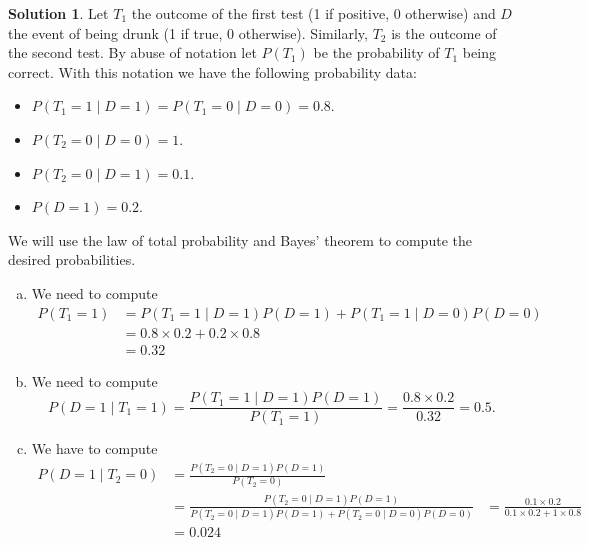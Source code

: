 \documentclass{article}
\theoremstyle{plain}
\theoremstyle{definition}
\newtheorem*{sol*}{Solution}
\begin{document}
\begin{sol*}
Let $T_1$ the outcome of the first test (1 if positive, 0 otherwise) and $D$ the event of being drunk (1 if true, 0 otherwise). Similarly, $T_2$ is the outcome of the second test. By abuse of notation let $P(T_1)$ be the probability of $T_1$ being correct. With this notation we have the following probability data:

\begin{itemize}
\item $P(T_1 = 1\mid D = 1)=P(T_1 = 0\mid D = 0)=0.8$.%

\item $P(T_2 = 0\mid D = 0)= 1$.

\item $P(T_2 = 0\mid D = 1)=0.1$.

\item $P(D=1)=0.2$.
\end{itemize}
We will use the law of total probability and Bayes' theorem to compute the desired probabilities.
\begin{enumerate}[(a)]
\item We need to compute
\begin{align*}
P(T_1=1)&=P(T_1=1\mid D=1)P(D=1)+P(T_1=1\mid D=0)P(D=0)\\
&=0.8\times 0.2 +  0.2\times 0.8 \\
&= 0.32
\end{align*}

\item We need to compute
\[P(D = 1 \mid T_1=1)= \frac{P(T_1=1\mid D=1)P(D=1)}{P(T_1 = 1)}=\frac{0.8\times 0.2}{0.32}=0.5.\]
\item We have to compute
\begin{align*}
P(D=1\mid T_2=0) &= \frac{P(T_2=0\mid D=1)P(D=1)}{P(T_2=0)}\\
&=\frac{P(T_2=0\mid D=1)P(D=1)}{P(T_2=0\mid D=1)P(D=1)+P(T_2=0\mid D=0)P(D=0)}
&=\frac{0.1\times 0.2}{0.1\times 0.2 + 1\times 0.8}\\
&=0.024
\end{align*}
\end{enumerate}
\end{sol*}
\end{document}
